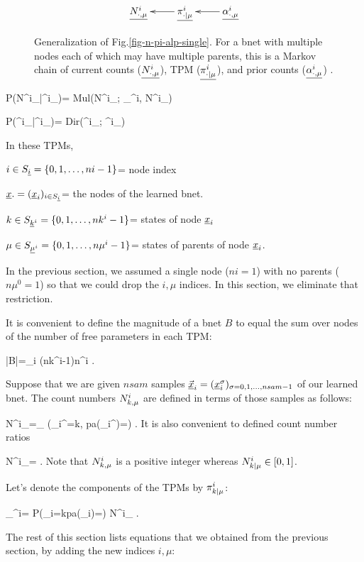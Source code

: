 \begin{figure}[h!]
$$
\xymatrix{
\ul{N^i_\dotmu}
&\ul{\pi^i_\dotbarmu}\ar[l]
&
\ul{\alp^i_\dotmu}\ar[l]
}$$
\caption{
Generalization
of Fig.\ref{fig-n-pi-alp-single}.
For a bnet with multiple nodes
each of which may have multiple parents,
this is  a
Markov chain of
current counts ($\underline{N^i_{\cdot, \mu}}$),
TPM ($\underline{\pi^i_{\cdot|\mu}}$),
and
prior counts ($\underline{\alpha^i_{\cdot, \mu}}$)
.}
\label{fig-n-pi-alp-many}
\end{figure}

\beq\color{blue}
P(N^i_\dotmu|\pi^i_\dotbarmu)=
Mul(N^i_\dotmu;
\pi_\dotbarmu^i, N^i_\plusmu)
\eeq

\beq\color{blue}
P(\pi^i_\dotbarmu|\alp^i_\dotmu)=
Dir(\pi^i_\dotbarmu; \alp^i_\dotmu)
\eeq

In these TPMs,

$i\in
S_{\underline{i}}=\{0, 1, \dots, ni-1\}$= node index

${\underline{x}}.=({\underline{x}}_i)_{i\in S_{\underline{i}}}$= the 
nodes of the learned bnet.

$k\in
S_{{\underline{k}}^i}=\{0, 1, \dots, nk^i-1\}$= states 
of node ${\underline{x}}_i$

$\mu\in
S_{\underline{\mu}^i}=\{0, 1, \dots, n\mu^i-1\}$=
states of parents of node ${\underline{x}}_i$.

In the previous section,
we assumed a single node ($ni=1$)
with no parents ($n\mu^0=1$)
so that 
we could drop  the $i, \mu$
indices.
In this section, we eliminate
that restriction.


It is 
convenient
to define the magnitude of a  bnet
 $B$
to equal the sum
over nodes of the number 
of free parameters in each TPM:

\beq
|B|=\sum_i
(nk^i-1)n\mu^i
\;.
\eeq

Suppose that 
we are given $nsam$ samples 
$
\vec{{\underline{x}}}_i=
({\underline{x}}_i^\sigma)_
{\sigma=0, 1, \ldots, nsam-1}
$ of 
our learned bnet. The count numbers
$N^i_{k,\mu}$ are defined 
in terms of those samples 
as follows:
 

\beq
N^i_\kmu=\sum_\sigma
\indi(\rvx_i^\s=k, pa(\rvx_i^\s)=\mu )
\;.
\eeq
It is also convenient
to
defined
count number ratios

\beq
N^i_\kbarmu=
\;.
\eeq
Note that
$N^i_{k,\mu}$
is a positive integer whereas
$N^i_{k|\mu}\in[0,1]$.

Let's denote
the components of the TPMs by
$\pi^i_{k|\mu}$:


\beq
\pi_\kbarmu^i=
P(\rvx_i=k\cond pa(\rvx_i)=\mu )
\approx
N^i_\kbarmu
\;.
\eeq


The rest
of this section
lists equations that
we obtained 
from the previous
section, by adding the new indices
$i, \mu$:

